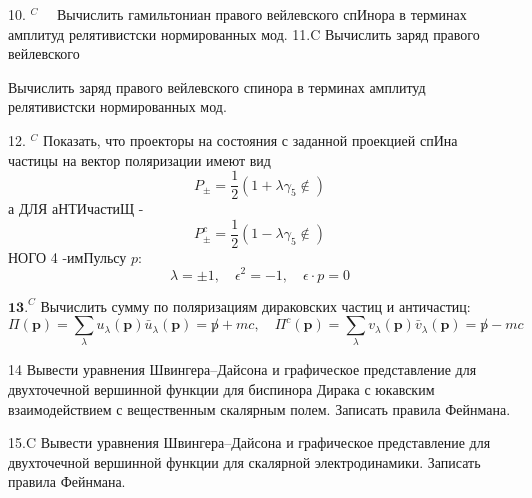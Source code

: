 \documentclass[a4paper,12pt]{article} %
\begin{document}
\begin{task}

10. $^{C} \quad$ Вычислить гамильтониан правого вейлевского спИнора в терминах амплитуд релятивистски нормированных мод. 11.C Вычислить заряд правого вейлевского 
\end{task}



\begin{task}

Вычислить заряд правого вейлевского спинора в терминах амплитуд релятивистски нормированных мод.

\end{task}



\begin{task}

12. $^{C}$ Показать, что проекторы на состояния с заданной проекцией
спИна частицы на вектор поляризации имеют вид
$$
P_{\pm}=\frac{1}{2}\left(1+\lambda \gamma_{5} \notin\right)
$$
а ДЛЯ аНТИчастиЩ -
$$
P_{\pm}^{c}=\frac{1}{2}\left(1-\lambda \gamma_{5} \notin\right)
$$
НОГО 4 -имПульсу $p:$
$$
\lambda=\pm 1, \quad \epsilon^{2}=-1, \quad \epsilon \cdot p=0
$$


\end{task}



\begin{task}


$\mathbf{1 3 .}^{C}$ Вычислить сумму по поляризациям дираковских частиц и античастиц:
$$
\Pi(\boldsymbol{p})=\sum_{\lambda} u_{\lambda}(\boldsymbol{p}) \bar{u}_{\lambda}(\boldsymbol{p})=\not p+m c, \quad \Pi^{c}(\boldsymbol{p})=\sum_{\lambda} v_{\lambda}(\boldsymbol{p}) \bar{v}_{\lambda}(\boldsymbol{p})=\not p-m c
$$


\end{task}






\begin{task}

14 Вывести уравнения Швингера–Дайсона и графическое представление для двухточечной вершинной функции для биспинора Дирака с юкавским взаимодействием с вещественным скалярным полем. Записать правила Фейнмана.


\end{task}



\begin{task}

15.C Вывести уравнения Швингера–Дайсона и графическое представление для двухточечной вершинной функции для скалярной электродинамики. Записать правила Фейнмана. 



\end{task}
\end{document}
